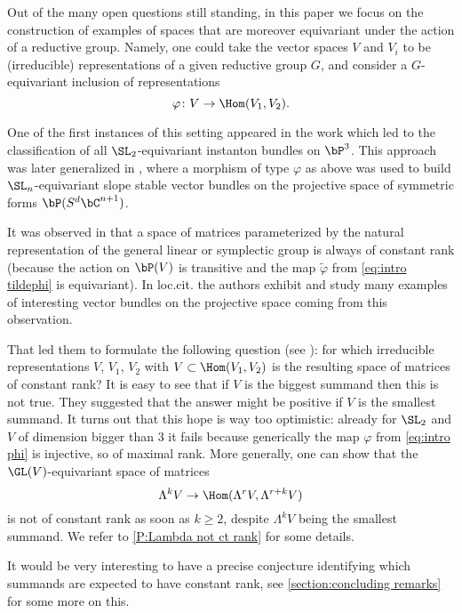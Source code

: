 \documentclass[reqno, 10pt]{amsart}
\theoremstyle{plain}
\theoremstyle{definition}
\numberwithin{equation}{section}%
\begin{document}
\smallskip


Out of the many open questions still standing, in this paper we focus on the construction of examples of spaces that are moreover equivariant under the action of a reductive group. 
Namely, one could take the vector spaces $V$ and $V_i$ to be (irreducible) representations of a given reductive group $G$, and consider a $G$-equivariant inclusion of representations 
\begin{equation}\label{eq:intro phi}
\varphi\colon V \to \Hom(V_1,V_2).
\end{equation}

One of the first instances of this setting appeared in the work \cite{Faenzi07} which led to the classification of all $\SL_2$-equivariant instanton bundles on $\bP^3$.
This approach was later generalized in \cite{BFL2}, where a morphism of type $\varphi$ as above was used to build $\SL_n$-equivariant slope stable vector bundles on the projective space of symmetric forms $\bP(S^d\bC^{n+1})$.

\smallskip


It was observed in \cite{landsberg-manivel} that a space of matrices parameterized by the natural representation of the general linear or symplectic group is always of constant rank (because the action on $\bP(V)$ is transitive and the map $\tilde\varphi$ from \eqref{eq:intro tildephi} is equivariant). 
In loc.cit. the authors exhibit and study many examples of interesting vector bundles on the projective space coming from this observation.

That led them to formulate the following question (see \cite[Question 4]{landsberg-manivel}):  for which irreducible representations $V$, $V_1$, $V_2$ with $V\subset\Hom(V_1,V_2)$ is the resulting space of matrices of constant rank?
It is easy to see that if $V$ is the biggest summand then this is not true.
They suggested that the answer might be positive if $V$ is the smallest summand.
It turns out that this hope is way too optimistic: already for $\SL_2$ and $V$ of dimension bigger than 3 it fails because generically the map $\varphi$ from \eqref{eq:intro phi} is injective, so of maximal rank. 
More generally, one can show that the $\GL(V)$-equivariant space of matrices 
\[\Lambda^kV\to\Hom(\Lambda^rV,\Lambda^{r+k}V)\]
is not of constant rank as soon as $k\ge 2$, despite $\Lambda^kV$
being the smallest summand.
We refer to \cref{P:Lambda not ct rank} for some
details.

\smallskip

It would be very interesting to have a precise conjecture identifying which summands are expected to have constant rank, see \cref{section:concluding remarks} for some more on this.
\end{document}
